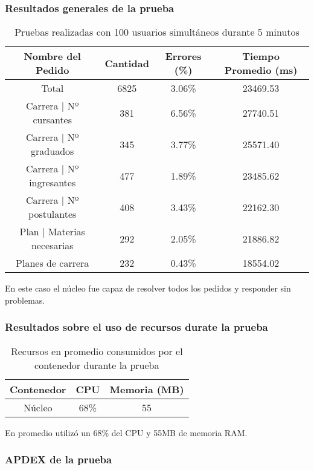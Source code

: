 \subsubsection{Resultados generales de la prueba}
\begin{table}[!htbp]
    \centering
    \makegapedcells
    \begin{tabular}{|c|c|c|c|}
    \hline
    Nombre del Pedido & Cantidad & Errores (\%) & Tiempo Promedio (ms) \\ \hline
    Total & 6825 & 3.06\% & 23469.53 \\ \hline
    Carrera | Nº cursantes & 381 & 6.56\% & 27740.51\\ \hline
    Carrera | Nº graduados & 345 & 3.77\% & 25571.40\\ \hline
    Carrera | Nº ingresantes & 477 & 1.89\% & 23485.62\\ \hline
    Carrera | Nº postulantes & 408 & 3.43\% & 22162.30\\ \hline
    Plan | Materias necesarias & 292 & 2.05\% & 21886.82\\ \hline
    Planes de carrera & 232 & 0.43\% & 18554.02\\ \hline

    \end{tabular}
    \caption{Pruebas realizadas con 100 usuarios simultáneos durante 5 minutos}
    \label{tab:tabla_planes}
\end{table}

En este caso el núcleo fue capaz de resolver todos los pedidos y responder sin problemas.

\subsubsection{Resultados sobre el uso de recursos durate la prueba}
\begin{table}[!htbp]
    \centering
    \makegapedcells
    \begin{tabular}{|c|c|c}
    \hline
    Contenedor & CPU & Memoria (MB)\\ \hline
    Núcleo & 68\% & 55 \\ \hline
    \end{tabular}
    \caption{Recursos en promedio consumidos por el contenedor durante la prueba}
    \label{tab:tabla_planes}
\end{table}

En promedio utilizó un 68\% del CPU y 55MB de memoria RAM.


\subsubsection{APDEX de la prueba}

